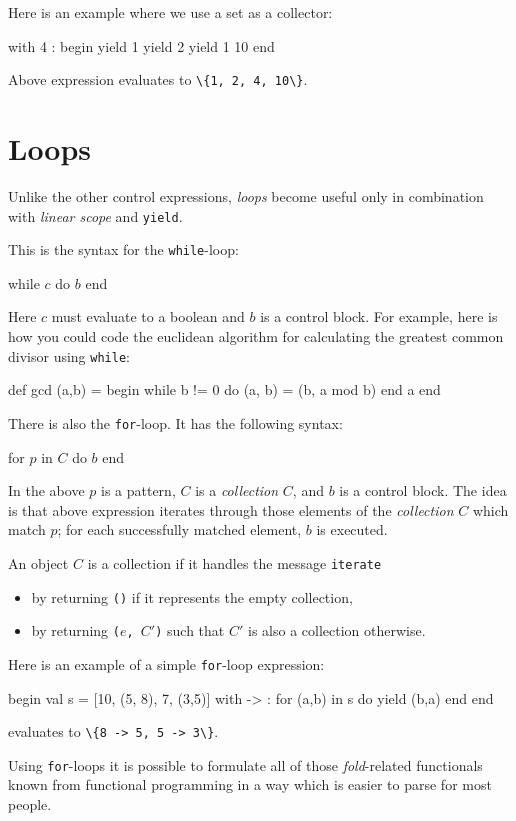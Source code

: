 \documentclass[11pt]{amsart}
\newcommand{\babelsrc}[1] {\lstinline!#1!}
\begin{document}
Here is an example where we use a set as a collector:
\begin{babellisting}
with {4} : begin
  yield 1
  yield 2
  yield 1
  10
end
\end{babellisting}
Above expression evaluates to \babelsrc{\{1, 2, 4, 10\}}.

\section{Loops}
Unlike the other control expressions, \emph{loops} become useful only in combination with \emph{linear scope} and \babelsrc{yield}. 

This is the syntax for the \babelsrc{while}-loop:
\begin{babellisting}
while $c$ do
  $b$
end
\end{babellisting}
Here $c$ must evaluate to a boolean and $b$ is a control block. For example, here is how you could code the euclidean algorithm for calculating the greatest common divisor using \babelsrc{while}:
\begin{babellisting}
def gcd (a,b) = begin
  while b != 0 do
    (a, b) = (b, a mod b)
  end
  a
end
\end{babellisting}

There is also the \babelsrc{for}-loop. It has the following syntax:
\begin{babellisting}
for $p$ in $C$ do
  $b$
end
\end{babellisting}
In the above $p$ is a pattern, $C$ is a \emph{collection} $C$, and $b$ is a control block.
The idea is that above expression iterates through those elements of the \emph{collection} $C$ 
which match $p$; for each successfully matched element, $b$ is executed. 

An object $C$ is a collection if it handles the message \texttt{iterate}
\begin{itemize}
\item by returning \texttt{()} if it represents the empty collection,
\item by returning \texttt{($e$, $C'$)} such that $C'$ is also a collection otherwise.
\end{itemize}

Here is an example of a simple \babelsrc{for}-loop expression:
\begin{babellisting}
begin
  val s = [10, (5, 8), 7, (3,5)]
  with {->} : for (a,b) in s do
    yield (b,a)
  end
end
\end{babellisting}
evaluates to \babelsrc{\{8 -> 5, 5 -> 3\}}.

Using \babelsrc{for}-loops it is possible to formulate all of those \emph{fold}-related functionals known from functional programming in a way which is easier to parse for most people. 
\end{document}
